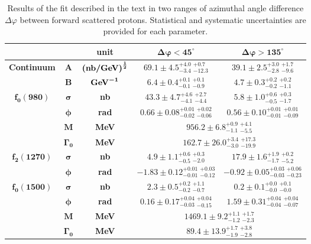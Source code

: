 {
\renewcommand{\arraystretch}{1.5}
\begin{table}[]\centering
\begin{tabular}{ccc c c}%
~ & ~ & \bf{unit} & $\bm{\Delta\varphi<45^{\circ}}$ & $\bm{\Delta\varphi>135^{\circ}}$ \\ \hline\hline \multirow{2}{*}{\bf{Continuum}} & $\bm{A}$ & $\bm{\left(\text{\bf{nb/GeV}}\right)^{\frac{1}{2}}}$ & $69.1 \pm 4.5 ^{+4.0}_{-3.4} ~^{+0.7}_{-12.3}$ & $39.1 \pm 2.5 ^{+3.0}_{-2.8} ~^{+1.7}_{-9.6}$ \\ %
& $\bm{B}$ & $\bm{\text{\bf{GeV}}^{-1}}$ & $6.4 \pm 0.4 ^{+0.1}_{-0.1} ~^{+0.1}_{-0.9}$ & $4.7 \pm 0.3 ^{+0.2}_{-0.2} ~^{+0.2}_{-1.1}$ \\ \hline
\multirow{4}{*}{$\bm{f_{0}(980)}$} & $\bm{\sigma}$ & \bf{nb} & $43.3 \pm 4.7 ^{+4.6}_{-4.1} ~^{+2.7}_{-4.4}$ & $5.8 \pm 1.0 ^{+0.6}_{-0.5} ~^{+0.3}_{-1.7}$ \\ & $\bm{\phi}$ & \bf{rad} & $0.66 \pm 0.08 ^{+0.01}_{-0.02} ~^{+0.02}_{-0.06}$ & $0.56 \pm 0.10 ^{+0.01}_{-0.01} ~^{+0.01}_{-0.09}$ \\ %
& $\bm{M}$ & \bf{MeV} & \multicolumn{2}{c}{$956.2 \pm 6.8 ^{+0.9}_{-1.1} ~^{+4.1}_{-5.5}$} \\ %
& $\bm{\Gamma_{0}}$ & \bf{MeV} & \multicolumn{2}{c}{$162.7 \pm 26.0 ^{+3.4}_{-3.0} ~^{+17.3}_{-19.9}$} \\ \hline
\multirow{2}{*}{$\bm{f_{2}(1270)}$} & $\bm{\sigma}$ & \bf{nb} & $4.9 \pm 1.1 ^{+0.6}_{-0.5} ~^{+0.3}_{-2.0}$ & $17.9 \pm 1.6 ^{+1.9}_{-1.7} ~^{+0.2}_{-5.2}$ \\ %
& $\bm{\phi}$ & \bf{rad} & $-1.83 \pm 0.12 ^{+0.01}_{-0.01} ~^{+0.03}_{-0.12}$ & $-0.92 \pm 0.05 ^{+0.03}_{-0.03} ~^{+0.06}_{-0.23}$ \\ \hline
\multirow{4}{*}{$\bm{f_{0}(1500)}$} & $\bm{\sigma}$ & \bf{nb} & $2.3 \pm 0.5 ^{+0.2}_{-0.2} ~^{+1.1}_{-0.7}$ & $0.2 \pm 0.1 ^{+0.0}_{-0.0} ~^{+0.1}_{-0.0}$ \\ %
& $\bm{\phi}$ & \bf{rad} & $0.16 \pm 0.17 ^{+0.04}_{-0.03} ~^{+0.04}_{-0.15}$ & $1.59 \pm 0.31 ^{+0.04}_{-0.04} ~^{+0.04}_{-0.07}$ \\ %
& $\bm{M}$ & \bf{MeV} & \multicolumn{2}{c}{$1469.1 \pm 9.2 ^{+1.1}_{-1.2} ~^{+1.7}_{-2.3}$} \\ %
& $\bm{\Gamma_{0}}$ & \bf{MeV} & \multicolumn{2}{c}{$89.4 \pm 13.9 ^{+1.7}_{-1.9} ~^{+3.8}_{-2.8}$} \\ \hline
\end{tabular}
\caption{Results of the fit described in the text in two ranges of azimuthal angle difference $\Delta\varphi$ between forward scattered protons. Statistical and systematic uncertainties are provided for each parameter.}\label{tab:fitRes}\vspace{-5pt} %
\end{table}
}
%
%

